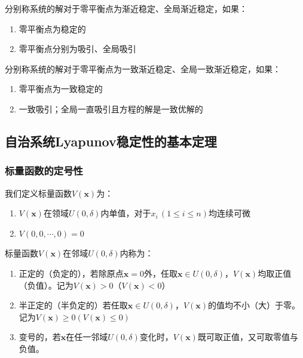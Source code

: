 \begin{definition}
    分别称系统的解对于零平衡点为渐近稳定、全局渐近稳定，如果：
    \begin{enumerate}
        \item 零平衡点为稳定的
        \item 零平衡点分别为吸引、全局吸引
    \end{enumerate}

    分别称系统的解对于零平衡点为一致渐近稳定、全局一致渐近稳定，如果：
    \begin{enumerate}
        \item 零平衡点为一致稳定的
        \item 一致吸引；全局一直吸引且方程的解是一致优解的
    \end{enumerate}
\end{definition}

\subsection{自治系统Lyapunov稳定性的基本定理}

\subsubsection{标量函数的定号性}

\begin{definition}
    我们定义标量函数$V(\bm{x})$为：
    \begin{enumerate}
        \item $V(\bm{x})$在领域$U(0,\delta)$内单值，对于$x_i\,(1\leq i \leq n)$均连续可微
        \item $V(0,0,\cdots,0) = 0$
    \end{enumerate}
\end{definition}

\begin{definition}
    标量函数$V(\bm{x})$在邻域$U(0,\delta)$内称为：
    \begin{enumerate}
        \item 正定的（负定的），若除原点$\bm{x} = 0$外，任取$\bm{x}\in U(0,\delta)$，$V(\bm{x})$均取正值（负值）。记为$V(\bm{x}) >0$（$V(\bm{x}) < 0$）
        \item 半正定的（半负定的）若任取$\bm{x} \in U(0,\delta)$，$V(\bm{x})$的值均不小（大）于零。记为$V(\bm{x})\geq 0(V(\bm{x})\leq 0)$
        \item 变号的，若$\bm{x}$在任一邻域$U(0,\delta)$变化时，$V(\bm{x})$既可取正值，又可取零值与负值。
    \end{enumerate}
\end{definition}

